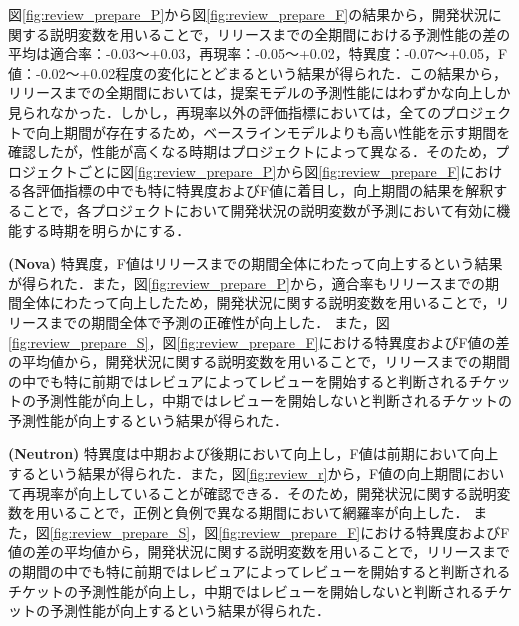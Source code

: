 \documentclass[submit]{ipsj}
\begin{document}
図\ref{fig:review_prepare_P}から図\ref{fig:review_prepare_F}の結果から，開発状況に関する説明変数を用いることで，リリースまでの全期間における予測性能の差の平均は適合率：-0.03〜+0.03，再現率：-0.05〜+0.02，特異度：-0.07〜+0.05，F値：-0.02〜+0.02程度の変化にとどまるという結果が得られた．この結果から，リリースまでの全期間においては，提案モデルの予測性能にはわずかな向上しか見られなかった．しかし，再現率以外の評価指標においては，全てのプロジェクトで向上期間が存在するため，ベースラインモデルよりも高い性能を示す期間を確認したが，性能が高くなる時期はプロジェクトによって異なる．そのため，プロジェクトごとに図\ref{fig:review_prepare_P}から図\ref{fig:review_prepare_F}における各評価指標の中でも特に特異度およびF値に着目し，向上期間の結果を解釈することで，各プロジェクトにおいて開発状況の説明変数が予測において有効に機能する時期を明らかにする．

\textbf{ (Nova) }特異度，F値はリリースまでの期間全体にわたって向上するという結果が得られた．また，図\ref{fig:review_prepare_P}から，適合率もリリースまでの期間全体にわたって向上したため，開発状況に関する説明変数を用いることで，リリースまでの期間全体で予測の正確性が向上した．
また，図\ref{fig:review_prepare_S}，図\ref{fig:review_prepare_F}における特異度およびF値の差の平均値から，開発状況に関する説明変数を用いることで，リリースまでの期間の中でも特に前期ではレビュアによってレビューを開始すると判断されるチケットの予測性能が向上し，中期ではレビューを開始しないと判断されるチケットの予測性能が向上するという結果が得られた．

\textbf{ (Neutron) }特異度は中期および後期において向上し，F値は前期において向上するという結果が得られた．また，図\ref{fig:review_r}から，F値の向上期間において再現率が向上していることが確認できる．そのため，開発状況に関する説明変数を用いることで，正例と負例で異なる期間において網羅率が向上した．
また，図\ref{fig:review_prepare_S}，図\ref{fig:review_prepare_F}における特異度およびF値の差の平均値から，開発状況に関する説明変数を用いることで，リリースまでの期間の中でも特に前期ではレビュアによってレビューを開始すると判断されるチケットの予測性能が向上し，中期ではレビューを開始しないと判断されるチケットの予測性能が向上するという結果が得られた．
\end{document}
